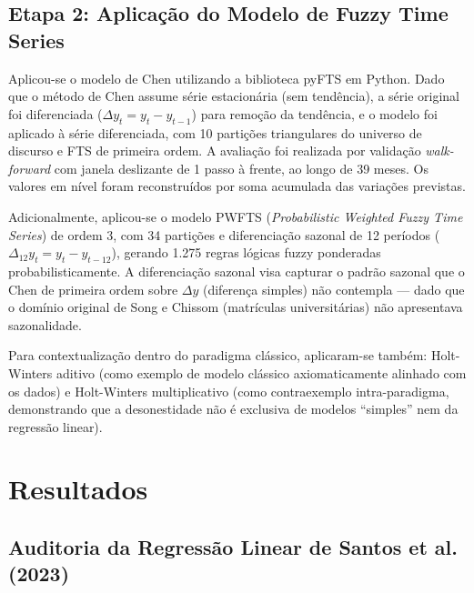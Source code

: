 \documentclass[
    12pt,
    oneside,
    openany,
    a4paper,
    english,
    brazil
]{abntex2}
\theoremstyle{definition}
\begin{document}
\section{Etapa 2: Aplicação do Modelo de Fuzzy Time Series}
\label{sec:fts-aplicacao}

Aplicou-se o modelo de Chen \cite{chen1996forecasting} utilizando a biblioteca pyFTS \cite{silva2018probabilistic} em Python. Dado que o método de Chen assume série estacionária (sem tendência), a série original foi diferenciada ($\Delta y_t = y_t - y_{t-1}$) para remoção da tendência, e o modelo foi aplicado à série diferenciada, com 10 partições triangulares do universo de discurso e FTS de primeira ordem. A avaliação foi realizada por validação \textit{walk-forward} com janela deslizante de 1 passo à frente, ao longo de 39 meses. Os valores em nível foram reconstruídos por soma acumulada das variações previstas.

Adicionalmente, aplicou-se o modelo PWFTS (\textit{Probabilistic Weighted Fuzzy Time Series}) de ordem 3, com 34 partições e diferenciação sazonal de 12 períodos ($\Delta_{12} y_t = y_t - y_{t-12}$), gerando 1.275 regras lógicas fuzzy ponderadas probabilisticamente. A diferenciação sazonal visa capturar o padrão sazonal que o Chen de primeira ordem sobre $\Delta y$ (diferença simples) não contempla --- dado que o domínio original de Song e Chissom (matrículas universitárias) não apresentava sazonalidade.

Para contextualização dentro do paradigma clássico, aplicaram-se também: Holt-Winters aditivo (como exemplo de modelo clássico axiomaticamente alinhado com os dados) e Holt-Winters multiplicativo (como contraexemplo intra-paradigma, demonstrando que a desonestidade não é exclusiva de modelos ``simples'' nem da regressão linear).

\chapter{Resultados}
\label{cap:resultados}

\section{Auditoria da Regressão Linear de Santos et al. (2023)}
\label{sec:resultados-auditoria}
\end{document}
